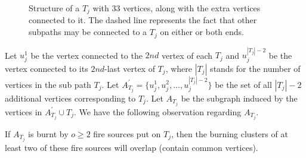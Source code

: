 \begin{figure}
    \caption{Structure of a $T_j$ with 33 vertices, along with the extra vertices connected to it. The dashed line represents the fact that other subpaths may be connected to a $T_j$ on either or both ends.}
    \label{figure:TStructureIG}
\end{figure}

Let $u^1_j$ be the vertex connected to the $2nd$ vertex of each $T_j$ and $u^{|T_j|-2}_j$ be the vertex connected to its $2nd$-last vertex of $T_j$, where $|T_j|$ stands for the number of vertices in the sub path $T_j$. Let $A_{T_j}^\prime=\{u^1_j, u^2_j, ..., u^{|T_j|-2}_j\}$ be the set of all $|T_j|-2$ additional vertices corresponding to $T_j$. Let $A_{T_j}$ be the subgraph induced by the vertices in $A_{T_j}^\prime\cup T_j$. We have the following observation regarding $A_{T_j}$.

\begin{observation}\label{observation:overlap}
If $A_{T_j}$ is burnt by $o\geq 2$ fire sources put on $T_j$, then the burning clusters of at least two of these fire sources will overlap (contain common vertices).
\end{observation}

